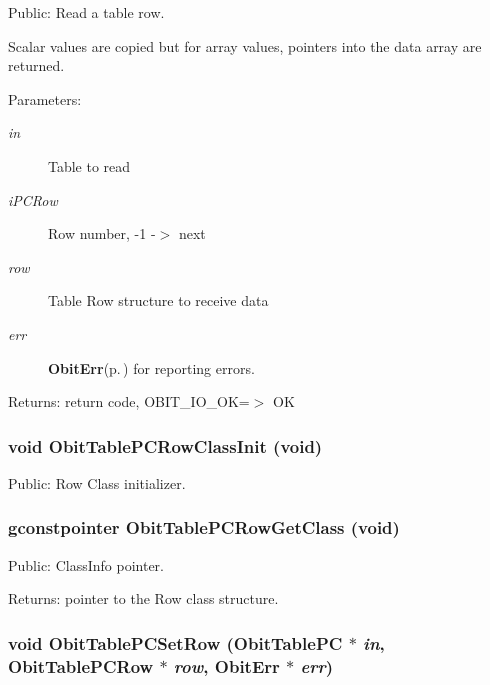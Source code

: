 Public: Read a table row. 

Scalar values are copied but for array values, pointers into the data array are returned. \begin{Desc}
\item[Parameters:]
\begin{description}
\item[{\em in}]Table to read \item[{\em i\-PCRow}]Row number, -1 -$>$ next \item[{\em row}]Table Row structure to receive data \item[{\em err}]{\bf Obit\-Err}{\rm (p.\,\pageref{structObitErr})} for reporting errors. \end{description}
\end{Desc}
\begin{Desc}
\item[Returns:]return code, OBIT\_\-IO\_\-OK=$>$ OK \end{Desc}
\subsubsection{\setlength{\rightskip}{0pt plus 5cm}void Obit\-Table\-PCRow\-Class\-Init (void)}\label{ObitTablePC_8h_a7}


Public: Row Class initializer. 

\subsubsection{\setlength{\rightskip}{0pt plus 5cm}gconstpointer Obit\-Table\-PCRow\-Get\-Class (void)}\label{ObitTablePC_8h_a9}


Public: Class\-Info pointer. 

\begin{Desc}
\item[Returns:]pointer to the Row class structure. \end{Desc}
\subsubsection{\setlength{\rightskip}{0pt plus 5cm}void Obit\-Table\-PCSet\-Row ({\bf Obit\-Table\-PC} $\ast$ {\em in}, {\bf Obit\-Table\-PCRow} $\ast$ {\em row}, {\bf Obit\-Err} $\ast$ {\em err})}\label{ObitTablePC_8h_a19}


